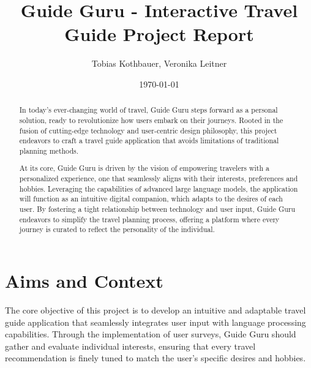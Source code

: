 \documentclass[english,notitlepage,smartquotes]{hgbreport}
\begin{document}

\author{Tobias Kothbauer, Veronika Leitner}                    %
\title{Guide Guru - Interactive Travel Guide Project Report}	                 %
\date{\today}

\maketitle

\begin{abstract}\noindent
In today's ever-changing world of travel, Guide Guru steps forward as a personal solution, ready to revolutionize how users embark on their journeys. Rooted in the fusion of cutting-edge technology and user-centric design philosophy, this project endeavors to craft a travel guide application that avoids limitations of traditional planning methods. 

\bigskip
\noindent At its core, Guide Guru is driven by the vision of empowering travelers with a personalized experience, one that seamlessly aligns with their interests, preferences and hobbies. Leveraging the capabilities of advanced large language models, the application will function as an intuitive digital companion, which adapts to the desires of each user. By fostering a tight relationship between technology and user input, Guide Guru endeavors to simplify the travel planning process, offering a platform where every journey is curated to reflect the personality of the individual. 

\bigskip
\noindent
\end{abstract}

\tableofcontents

\chapter{Aims and Context}

The core objective of this project is to develop an intuitive and adaptable travel guide application that seamlessly integrates user input with language processing capabilities. Through the implementation of user surveys, Guide Guru should gather and evaluate individual interests, ensuring that every travel recommendation is finely tuned to match the user's specific desires and hobbies.
\end{document}
